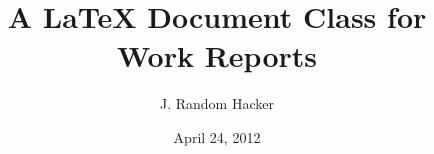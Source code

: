 \documentclass{uw-wkrpt}
\begin{document}

\title{A \LaTeX{} Document Class for Work Reports}

\author{J. Random Hacker}


\address{123 University Ave. W.\\*
         Waterloo, ON\ \ N2L 3G1}







\date{April 24, 2012}

\maketitle

\frontmatter
\end{document}
